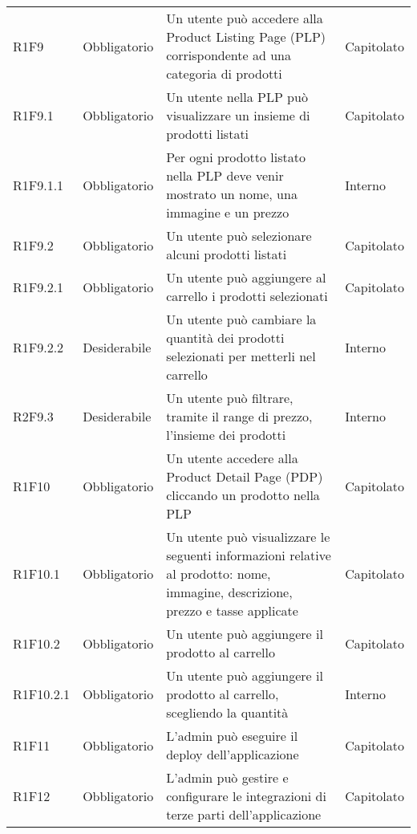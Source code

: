 {\begin{longtable}{C{2.5cm} C{2.8cm} C{6.7cm} C{2.5cm}}
R1F9 & Obbligatorio & Un utente può accedere alla Product Listing Page (PLP) corrispondente ad una categoria di prodotti & Capitolato \\
R1F9.1 & Obbligatorio & Un utente nella PLP può visualizzare un insieme di prodotti listati & Capitolato \\
R1F9.1.1 & Obbligatorio & Per ogni prodotto listato nella PLP deve venir mostrato un nome, una immagine e un prezzo & Interno \\
R1F9.2 & Obbligatorio & Un utente può selezionare alcuni prodotti listati & Capitolato \\
R1F9.2.1 & Obbligatorio & Un utente può aggiungere al carrello i prodotti selezionati & Capitolato \\
R1F9.2.2 & Desiderabile & Un utente può cambiare la quantità dei prodotti selezionati per metterli nel carrello & Interno \\
R2F9.3 & Desiderabile & Un utente può filtrare, tramite il range di prezzo, l'insieme dei prodotti & Interno \\


R1F10 & Obbligatorio & Un utente accedere alla Product Detail Page (PDP) cliccando un prodotto nella PLP & Capitolato \\
R1F10.1 & Obbligatorio & Un utente può visualizzare le seguenti informazioni relative al prodotto: nome, immagine, descrizione, prezzo e tasse applicate & Capitolato \\
R1F10.2 & Obbligatorio & Un utente può aggiungere il prodotto al carrello & Capitolato \\
R1F10.2.1 & Obbligatorio & Un utente può aggiungere il prodotto al carrello, scegliendo la quantità & Interno \\


R1F11 & Obbligatorio & L'admin può eseguire il deploy dell'applicazione & Capitolato \\
R1F12 & Obbligatorio & L'admin può gestire e configurare le integrazioni di terze parti dell'applicazione & Capitolato \\

\end{longtable}

}
